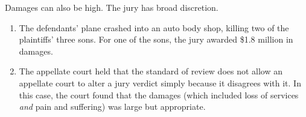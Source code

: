 Damages can also be high. The jury has broad discretion.

\begin{enumerate}
    \item The defendants' plane crashed into an auto body shop, killing two of 
    the plaintiffs' three sons. For one of the sons, the jury awarded \$1.8 
    million in damages.
    \item The appellate court held that the standard of review does not allow 
    an appellate court to alter a jury verdict simply because it disagrees 
    with it. In this case, the court found that the damages (which included 
    loss of services \emph{and} pain and suffering) was large but appropriate.
\end{enumerate}

